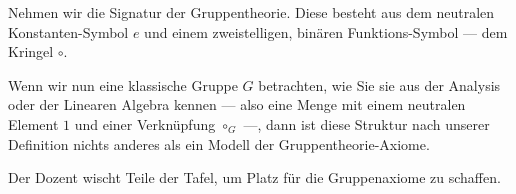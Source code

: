 \begin{spoken-clean}[00:12:15 - 00:12:55]
Nehmen wir die Signatur der Gruppentheorie. Diese besteht aus dem neutralen Konstanten-Symbol $e$ und einem zweistelligen, binären Funktions-Symbol --- dem Kringel $\circ$.

Wenn wir nun eine klassische Gruppe $G$ betrachten, wie Sie sie aus der Analysis oder der Linearen Algebra kennen --- also eine Menge mit einem neutralen Element $1$ und einer Verknüpfung $\circ_G$ ---, dann ist diese Struktur nach unserer Definition nichts anderes als ein Modell der Gruppentheorie-Axiome.
\end{spoken-clean}

\begin{math-stroke}
\end{math-stroke}

\begin{lecture-break}[Tafelreinigung]
Der Dozent wischt Teile der Tafel, um Platz für die Gruppenaxiome zu schaffen.
\end{lecture-break}

